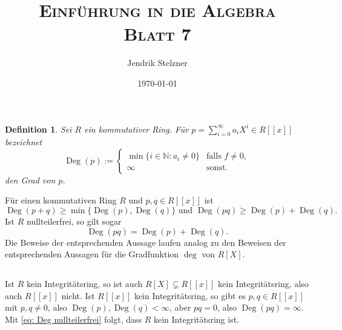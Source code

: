 \documentclass[a4paper,10pt]{article}
\title{\textsc{Einführung in die Algebra \\ \Large Blatt 7}}
\author{Jendrik Stelzner}
\date{\today}
\newtheorem*{defi}{Definition}
\newcommand{\N}{\mathbb{N}}
\newcommand{\Deg}{\operatorname{Deg}}
\begin{document}
\maketitle





\section{}





\section{}





\section{}





\section{}

\begin{defi}
Sei $R$ ein kommutativer Ring. Für $p = \sum_{i=0}^\infty a_i X^i \in R[\![x]\!]$ bezeichnet
\[
 \Deg(p) :=
 \begin{cases}
  \min \{i \in \N : a_i \neq 0\} & \text{falls } f \neq 0, \\
                          \infty & \text{sonst}.
 \end{cases}
\]
den Grad von $p$.
\end{defi}
Für einen kommutativen Ring $R$ und $p,q \in R[\![x]\!]$ ist
\begin{equation}\label{eq: Deg Ungleichungen}
 \Deg(p+q) \geq \min \{\Deg(p), \Deg(q)\} \text{ und }
 \Deg(pq) \geq \Deg(p) + \Deg(q).
\end{equation}
Ist $R$ nullteilerfrei, so gilt sogar
\begin{equation}\label{eq: Deg nullteilerfrei}
 \Deg(pq) = \Deg(p) + \Deg(q).
\end{equation}
Die Beweise der entsprechenden Aussage laufen analog zu den Beweisen der entsprechenden Aussagen für die Gradfunktion $\deg$ von $R[X]$.


\subsection{}
Ist $R$ kein Integritätsring, so ist auch $R[X] \subsetneq R[\![x]\!]$ kein Integritätsring, also auch $R[\![x]\!]$ nicht. Ist $R[\![x]\!]$ kein Integritätsring, so gibt es $p, q \in R[\![x]\!]$ mit $p,q \neq 0$, also $\Deg(p), \Deg(q) < \infty$, aber $pq = 0$, also $\Deg(pq) = \infty$. Mit \eqref{eq: Deg nullteilerfrei} folgt, dass $R$ kein Integritätsring ist.
\end{document}
